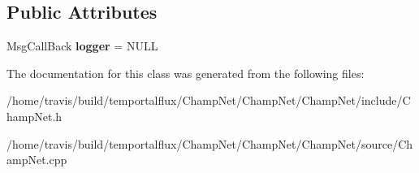 \subsection*{Public Attributes}
\begin{DoxyCompactItemize}
\item 
\hypertarget{class_champ_net_1_1_network_a4588391c9f6064ad7fb83a08f0ea02c6}{Msg\-Call\-Back {\bfseries logger} = N\-U\-L\-L}\label{class_champ_net_1_1_network_a4588391c9f6064ad7fb83a08f0ea02c6}

\end{DoxyCompactItemize}


The documentation for this class was generated from the following files\-:\begin{DoxyCompactItemize}
\item 
/home/travis/build/temportalflux/\-Champ\-Net/\-Champ\-Net/\-Champ\-Net/include/Champ\-Net.\-h\item 
/home/travis/build/temportalflux/\-Champ\-Net/\-Champ\-Net/\-Champ\-Net/source/Champ\-Net.\-cpp\end{DoxyCompactItemize}
